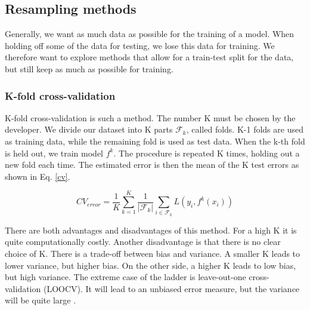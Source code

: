 




\subsection{Resampling methods}

Generally, we want as much data as possible for the training of a model. When holding off some of the data for testing, we lose this data for training. We therefore want to explore methods that allow for a train-test split for the data, but still keep as much as possible for training. 

\subsubsection{K-fold cross-validation}
K-fold cross-validation is such a method. The number K must be chosen by the developer. We divide our dataset into K parts $\mathcal{F}_k$, called folds. K-1 folds are used as training data, while the remaining fold is used as test data. When the k-th fold is held out, we train model $f^{k}$. 
The procedure is repeated K times, holding out a new fold each time. The estimated error is then the mean of the K test errors as shown in Eq. \ref{cv}. \citep[p. 241]{hastie}


\begin{equation}\label{cv}
    CV_{error} = \frac{1}{K} \sum_{k=1}^{K} \frac{1}{|\mathcal{F}_k|} \sum_{i \in \mathcal{F}_k} L\left(y_i, f^{k}({x}_i)\right) 
\end{equation}

There are both advantages and disadvantages of this method. For a high K it is quite computationally costly. Another disadvantage is that there is no clear choice of K. There is a trade-off between bias and variance. A smaller K leads to lower variance, but higher bias. On the other side, a higher K leads to low bias, but high variance. The extreme case of the ladder is leave-out-one cross-validation (LOOCV). It will lead to an unbiased error measure, but the variance will be quite large \citep[p. 242]{hastie}.

